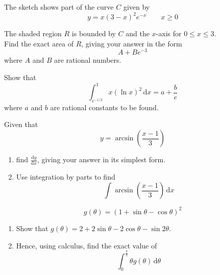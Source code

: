 \documentclass[leqno]{article}
\begin{document}
\begin{enumerate}[
  label=\textbf{\arabic*.},
  leftmargin=*,
  topsep=0pt,
  partopsep=0pt,
  parsep=0pt
]
The sketch shows part of the curve $C$ given by
\[
y = x(3-x)^2 e^{-x} \qquad x \geq 0
\]

The shaded region $R$ is bounded by $C$ and the $x$-axis for $0 \leq x \leq 3$. \\

Find the exact area of $R$, giving your answer in the form
\[
A + Be^{-3}
\]
where $A$ and $B$ are rational numbers. 

\newpage


\questionitem

Show that
\[
\int_{e^{-1/2}}^1 x(\ln x)^2\,\mathrm{d}x = a + \frac{b}{e}
\]
where $a$ and $b$ are rational constants to be found. 

\newpage


\questionitem

Given that
\[
y = \arcsin\left(\frac{x-1}{3}\right)
\]
\begin{enumerate}[label=\textbf{(\alph*)}]
  \item find $\frac{\mathrm{d}y}{\mathrm{d}x}$, giving your answer in its simplest form.  \\
  \item Use integration by parts to find
  \[
  \int \arcsin\left(\frac{x-1}{3}\right)\,\mathrm{d}x
  \]
\end{enumerate}

\newpage

\questionitem

\[
g(\theta)=(1+\sin\theta-\cos\theta)^2
\]
\begin{enumerate}[label=\textbf{(\alph*)}]
  \item Show that $g(\theta)=2+2\sin\theta-2\cos\theta-\sin 2\theta$.  \\
  \item Hence, using calculus, find the exact value of
  \[
  \int_{0}^{\frac{\pi}{2}} \theta g(\theta)\,\mathrm{d}\theta
  \]
\end{enumerate}

\newpage

\questionitem


\end{enumerate}
\end{document}
